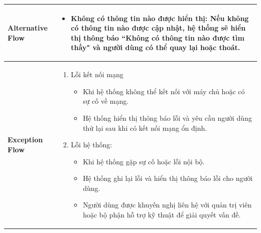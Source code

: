 \begin{longtable}[H]{|l|p{}|}
        \hline
        
        \textbf{Alternative Flow} & \vspace{-1cm}  \begin{itemize}[leftmargin=4mm]
            \setlength\itemsep{0em}
            \item Không có thông tin nào được hiển thị: Nếu không có thông tin nào được cập nhật, hệ thống sẽ hiển thị thông báo ``Không có thông tin nào được tìm thấy" và người dùng có thể quay lại hoặc thoát.
        \end{itemize} \\
        
        \hline
        
        \textbf{Exception Flow} & \vspace{-1cm}  \begin{enumerate}[leftmargin=5.5mm]
            \setlength\itemsep{0em}
            \item Lỗi kết nối mạng
                \begin{itemize}
                    \setlength\itemsep{0em}
                    \item Khi hệ thống không thể kết nối với máy chủ hoặc có sự cố về mạng.
                    \item Hệ thống hiển thị thông báo lỗi và yêu cầu người dùng thử lại sau khi có kết nối mạng ổn định.
                \end{itemize}
            \item Lỗi hệ thống:
                \begin{itemize}
                    \setlength\itemsep{0em}
                    \item Khi hệ thống gặp sự cố hoặc lỗi nội bộ.
                    \item Hệ thống ghi lại lỗi và hiển thị thông báo lỗi cho người dùng.
                    \item Người dùng được khuyến nghị liên hệ với quản trị viên hoặc bộ phận hỗ trợ kỹ thuật để giải quyết vấn đề.
                \end{itemize}
        \end{enumerate}\\
        \hline
    \end{longtable}


